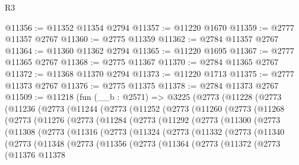 \begin{lexlean}{R3}
\begin{coremodule}
@11356 := @11352 @11354 @2794
@11357 := @11220 @1670
@11359 := @2777 @11357 @2767
@11360 := @2775 @11359
@11362 := @2784 @11357 @2767
@11364 := @11360 @11362 @2794
@11365 := @11220 @1695
@11367 := @2777 @11365 @2767
@11368 := @2775 @11367
@11370 := @2784 @11365 @2767
@11372 := @11368 @11370 @2794
@11373 := @11220 @1713
@11375 := @2777 @11373 @2767
@11376 := @2775 @11375
@11378 := @2784 @11373 @2767
@11509 := @11218
    (fun (__b : @2571) =>
    @3225
      (@2773
        (@11228
          (@2773
            (@11236
              (@2773
                (@11244
                  (@2773
                    (@11252
                      (@2773
                        (@11260
                          (@2773
                            (@11268
                              (@2773
                                (@11276
                                  (@2773
                                    (@11284
                                      (@2773
                                        (@11292
                                          (@2773
                                            (@11300
                                              (@2773
                                                (@11308
                                                  (@2773
                                                    (@11316
                                                      (@2773
                                                        (@11324
                                                          (@2773
                                                            (@11332
                                                              (@2773
                                                                (@11340
                                                                  (@2773
                                                                    (@11348
                                                                      (@2773
                                                                        (@11356
                                                                          (@2773
                                                                            (@11364
                                                                              (@2773
                                                                                (@11372
                                                                                  (@2773
                                                                                    (@11376
                                                                                      @11378

\end{coremodule}
\end{lexlean}
